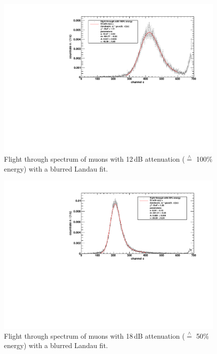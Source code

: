 \begin{figure}[H]
\begin{center}
  \includegraphics[width=\textwidth]{../img/energiekalibration_100.pdf}
  \caption{Flight through spectrum of muons with 12\,dB attenuation ($\overset{\wedge}{=}$ 100\% energy) with a blurred Landau fit.}
  \label{img:ecal:100}
\end{center}
\end{figure}

\begin{figure}[H]
\begin{center}
  \includegraphics[width=\textwidth]{../img/energiekalibration_50.pdf}
  \caption{Flight through spectrum of muons with 18\,dB attenuation ($\overset{\wedge}{=}$ 50\% energy) with a blurred Landau fit.}
  \label{img:ecal:50}
\end{center}
\end{figure}

